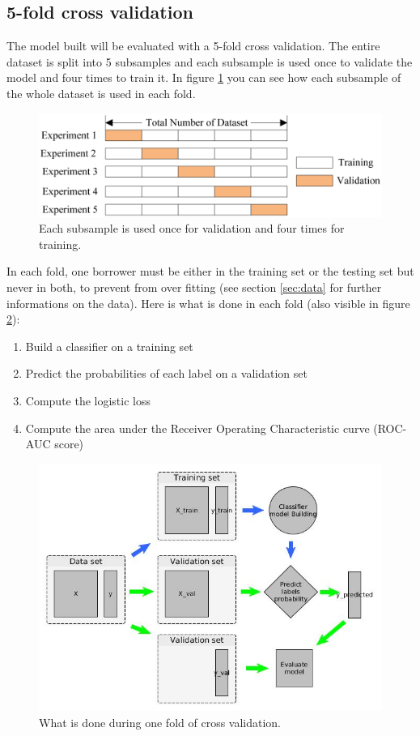 	\subsection{5-fold cross validation}
		The model built will be evaluated with a 5-fold cross validation. The entire dataset is split into 5 subsamples and each subsample is used once to validate the model and four times to train it. In figure \ref{fig:5_fold_cv} you can see how each subsample of the whole dataset is used in each fold.

	\begin{figure}[h]
		\centering
		\includegraphics[width=\textwidth]{images/5_fold_cv.png}
		\caption{Each subsample is used once for validation and four times for training.}
		\label{fig:5_fold_cv}
	\end{figure}

	In each fold, one borrower must be either in the training set or the testing set but never in both, to prevent from over fitting (see section \ref{sec:data} for further informations on the data). Here is what is done in each fold (also visible in figure \ref{fig:cv_process}):
	\begin{enumerate}
		\item Build a classifier on a training set
		\item Predict the probabilities of each label on a validation set
		\item Compute the logistic loss
		\item Compute the area under the Receiver Operating Characteristic curve (ROC-AUC score)
	\end{enumerate}

	\begin{figure}[h]
		\centering
		\includegraphics[width=\textwidth]{images/cv_process.jpg}
		\caption{What is done during one fold of cross validation.}
		\label{fig:cv_process}
	\end{figure}

